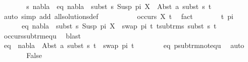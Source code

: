 \begin{isabellebody}
\ \ \ \ \isamarkupfalse%
\ \isamarkupfalse%
\ s\ nabla\ \ eq{}{\isacharcolon}{\kern0pt}\ {\isachardoublequoteopen}nabla\ {\isasymturnstile}\ subst\ s\ {\isacharparenleft}{\kern0pt}Susp\ pi\ X{\isacharparenright}{\kern0pt}\ {\isasymapprox}\ Abst\ a\ {\isacharparenleft}{\kern0pt}subst\ s\ t{\isacharparenright}{\kern0pt}{\isachardoublequoteclose}\isanewline
\ \ \ \ \ \ \isamarkupfalse%
\ {\isacharparenleft}{\kern0pt}auto\ simp\ add{\isacharcolon}{\kern0pt}\ all{\isacharunderscore}{\kern0pt}solutions{\isacharunderscore}{\kern0pt}def{\isacharparenright}{\kern0pt}\isanewline
\ \ \ \ \isamarkupfalse%
\isanewline
\ \ \ \ \isamarkupfalse%
\ {\isachardoublequoteopen}occurs\ X\ t{\isachardoublequoteclose}\ \isamarkupfalse%
\ fact\isanewline
\ \ \ \ \isamarkupfalse%
\ \isamarkupfalse%
\ t{\isacharprime}{\kern0pt}\ pi{\isacharprime}{\kern0pt}\ \ \ \isanewline
\ \ \ \ \ \ eq{}{\isacharcolon}{\kern0pt}\ {\isachardoublequoteopen}nabla\ {\isasymturnstile}\ subst\ s\ {\isacharparenleft}{\kern0pt}Susp\ pi\ X{\isacharparenright}{\kern0pt}\ {\isasymapprox}\ swap\ pi{\isacharprime}{\kern0pt}\ t{\isacharprime}{\kern0pt}{\isachardoublequoteclose}\ {\isachardoublequoteopen}t{\isacharprime}{\kern0pt}{\isasymin}sub{\isacharunderscore}{\kern0pt}trms\ {\isacharparenleft}{\kern0pt}subst\ s\ t{\isacharparenright}{\kern0pt}{\isachardoublequoteclose}\isanewline
\ \ \ \ \ \ \isamarkupfalse%
\ occurs{\isacharunderscore}{\kern0pt}sub{\isacharunderscore}{\kern0pt}trm{\isacharunderscore}{\kern0pt}equ\ \isamarkupfalse%
\ blast\isanewline
\ \ \ \ \isamarkupfalse%
\ \ \isanewline
\ \ \ \ \isamarkupfalse%
\ eq{}{\isacharcolon}{\kern0pt}\ {\isachardoublequoteopen}{\isasymnot}\ nabla\ {\isasymturnstile}\ {\isacharparenleft}{\kern0pt}Abst\ a\ {\isacharparenleft}{\kern0pt}subst\ s\ t{\isacharparenright}{\kern0pt}{\isacharparenright}{\kern0pt}\ {\isasymapprox}\ swap\ pi{\isacharprime}{\kern0pt}\ t{\isacharprime}{\kern0pt}{\isachardoublequoteclose}\isanewline
\ \ \ \ \ \ \isamarkupfalse%
\ eq{}\ psub{\isacharunderscore}{\kern0pt}trm{\isacharunderscore}{\kern0pt}not{\isacharunderscore}{\kern0pt}equ\ \isamarkupfalse%
\ auto\isanewline
\ \ \ \ \isamarkupfalse%
\ \isamarkupfalse%
\ {\isachardoublequoteopen}False{\isachardoublequoteclose}\ \isamarkupfalse%

\end{isabellebody}
